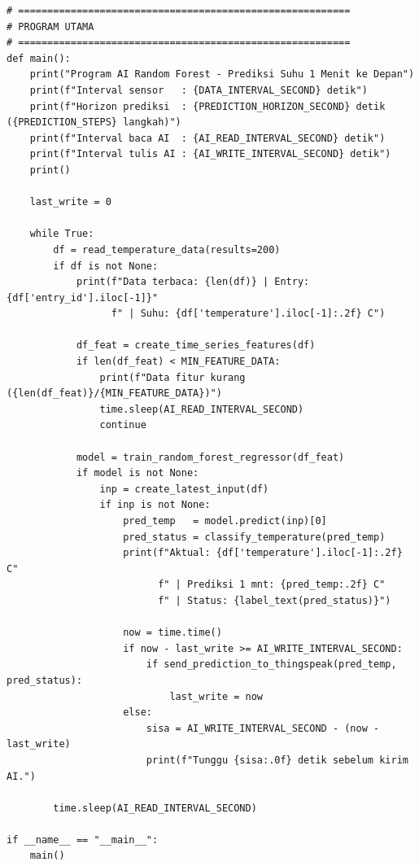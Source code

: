 \begin{lstlisting}[style=pythonstyle,
    caption={Program Python AI Random Forest Regressor untuk Prediksi Suhu 1 Menit},
    label={lst:python}]
# =========================================================
# PROGRAM UTAMA
# =========================================================
def main():
    print("Program AI Random Forest - Prediksi Suhu 1 Menit ke Depan")
    print(f"Interval sensor   : {DATA_INTERVAL_SECOND} detik")
    print(f"Horizon prediksi  : {PREDICTION_HORIZON_SECOND} detik ({PREDICTION_STEPS} langkah)")
    print(f"Interval baca AI  : {AI_READ_INTERVAL_SECOND} detik")
    print(f"Interval tulis AI : {AI_WRITE_INTERVAL_SECOND} detik")
    print()

    last_write = 0

    while True:
        df = read_temperature_data(results=200)
        if df is not None:
            print(f"Data terbaca: {len(df)} | Entry: {df['entry_id'].iloc[-1]}"
                  f" | Suhu: {df['temperature'].iloc[-1]:.2f} C")

            df_feat = create_time_series_features(df)
            if len(df_feat) < MIN_FEATURE_DATA:
                print(f"Data fitur kurang ({len(df_feat)}/{MIN_FEATURE_DATA})")
                time.sleep(AI_READ_INTERVAL_SECOND)
                continue

            model = train_random_forest_regressor(df_feat)
            if model is not None:
                inp = create_latest_input(df)
                if inp is not None:
                    pred_temp   = model.predict(inp)[0]
                    pred_status = classify_temperature(pred_temp)
                    print(f"Aktual: {df['temperature'].iloc[-1]:.2f} C"
                          f" | Prediksi 1 mnt: {pred_temp:.2f} C"
                          f" | Status: {label_text(pred_status)}")

                    now = time.time()
                    if now - last_write >= AI_WRITE_INTERVAL_SECOND:
                        if send_prediction_to_thingspeak(pred_temp, pred_status):
                            last_write = now
                    else:
                        sisa = AI_WRITE_INTERVAL_SECOND - (now - last_write)
                        print(f"Tunggu {sisa:.0f} detik sebelum kirim AI.")

        time.sleep(AI_READ_INTERVAL_SECOND)

if __name__ == "__main__":
    main()
\end{lstlisting}
